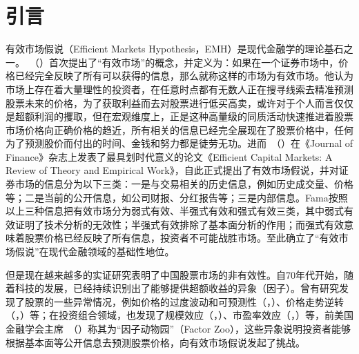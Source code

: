 
\chapter{引言}
有效市场假说（Efficient Markets Hypothesis，EMH）是现代金融学的理论基石之一。~\citeauthor{famaBehaviorStockMarketPrices1965}（\citeyear{famaBehaviorStockMarketPrices1965}）首次提出了“有效市场”的概念，并定义为：如果在一个证券市场中，价格已经完全反映了所有可以获得的信息，那么就称这样的市场为有效市场。他认为市场上存在着大量理性的投资者，在任意时点都有无数人正在搜寻线索去精准预测股票未来的价格，为了获取利益而去对股票进行低买高卖，或许对于个人而言仅仅是超额利润的攫取，但在宏观维度上，正是这种高量级的同质活动快速推进着股票市场价格向正确价格的趋近，所有相关的信息已经完全展现在了股票价格中，任何为了预测股价而付出的时间、金钱和努力都是徒劳无功。进而~\citeauthor{famaEfficientCapitalMarkets1970}（\citeyear{famaEfficientCapitalMarkets1970}）在《Journal of Finance》杂志上发表了最具划时代意义的论文《Efficient Capital Markets: A Review of Theory and Empirical Work》，自此正式提出了有效市场假说，并对证券市场的信息分为以下三类：一是与交易相关的历史信息，例如历史成交量、价格等；二是当前的公开信息，如公司财报、分红报告等；三是内部信息。Fama按照以上三种信息把有效市场分为弱式有效、半强式有效和强式有效三类，其中弱式有效证明了技术分析的无效性；半强式有效排除了基本面分析的作用；而强式有效意味着股票价格已经反映了所有信息，投资者不可能战胜市场。至此确立了“有效市场假说”在现代金融领域的基础性地位。

但是现在越来越多的实证研究表明了中国股票市场的非有效性。自70年代开始，随着科技的发展，已经持续识别出了能够提供超额收益的异象（因子）。曾有研究发现了股票的一些异常情况，例如价格的过度波动和可预测性（\citeauthor{shillerStockPricesMove1980}，\citeyear{shillerStockPricesMove1980}）、价格走势逆转（\citeauthor{shleiferPoliticiansFirms1994}，\citeyear{shleiferPoliticiansFirms1994}）等；在投资组合领域，也发现了规模效应（\citeauthor{bamberTradingVolumeDifferent1997}，\citeyear{bamberTradingVolumeDifferent1997}）、市盈率效应（\citeauthor{banzRelationshipReturnMarket1981}，\citeyear{banzRelationshipReturnMarket1981}）等，前美国金融学会主席~\citeauthor{cochranePresidentialAddressDiscount2011}（\citeyear{cochranePresidentialAddressDiscount2011}）称其为“因子动物园”（Factor Zoo），这些异象说明投资者能够根据基本面等公开信息去预测股票价格，向有效市场假说发起了挑战。

